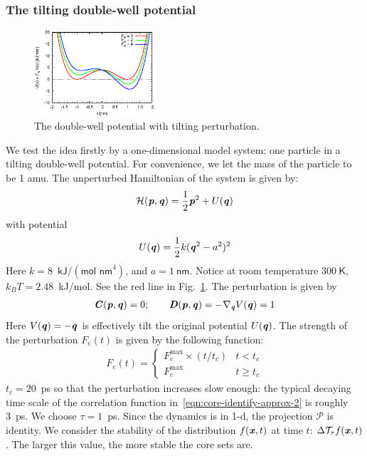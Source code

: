 \documentclass[aip,jcp,a4paper,reprint,onecolumn]{revtex4-1}
\newcommand{\vect}[1]{\textbf{\textit{#1}}}
\newcommand{\mh}{\mathcal H}
\newcommand{\mt}{\mathcal T}
\begin{document}
\subsubsection{The tilting double-well potential}

\begin{figure}
  \centering
  \includegraphics[width=0.4\textwidth]{figs/fig-tilt-pot.eps}
  \caption{The double-well potential with tilting perturbation.}
  \label{fig:tmp1}
\end{figure}

We test the idea firstly by a one-dimensional model system: one particle in a
tilting double-well potential. For convenience, we let the mass of the
particle to be 1 \textsf{amu}. The unperturbed
Hamiltonian of the system is given by:
\begin{align}
  \mh (\vect p, \vect q) = \frac 12 \vect p^2 + U(\vect q) 
\end{align}
with potential
\begin{align}
  U(\vect q) = \frac12 k (\vect q^2 - a^2)^2
\end{align}
Here $k = 8$~$\textsf{kJ} / (\textsf{mol nm}^4)$, and $ a = 1\ \textsf{nm}$.
Notice at room temperature $300\ \textsf{K}$, $k_BT = 2.48$~\textsf{kJ/mol}.
See the red line in Fig.~\ref{fig:tmp1}.
The perturbation is given by
\begin{align}
  \vect C(\vect p, \vect q) = 0; \qquad
  \vect D(\vect p, \vect q) = -\nabla_{\vect q} V(\vect q) = 1
\end{align}
Here $V(\vect q) = -\vect q$ is  effectively tilt the original
potential $U(\vect q)$. The strength of the perturbation $F_e(t)$ is given
by the following function:
\begin{align}
  F_e(t) = 
  \begin{cases}
    F_e^{\textrm{max}}\times (t / t_c) & t < t_c \\
    F_e^{\textrm{max}} & t \geq t_c
  \end{cases}
\end{align}
$t_c = 20$~\textsf{ps} so that the perturbation increases slow
enough: the typical decaying time scale of the correlation function
in~\eqref{eqn:core-identify-approx-2} is roughly 3~\textsf{ps}.
We choose $\tau = 1$~\textsf{ps}.
Since the dynamics is in
1-d, the projection $\mathcal P$ is identity.  We consider the stability of the
distribution $f(\vect x, t)$ at time $t$: $\Delta\mt_\tau f(\vect x, t)$.
The larger
this value, the more stable the core sets are.
\end{document}
